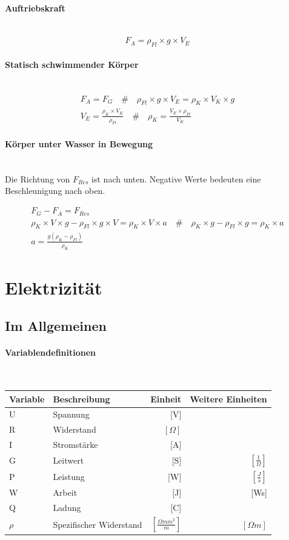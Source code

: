 \documentclass[a4paper,10pt]{article}
\newcommand{\lbparagraph}[1]{\paragraph{#1}\mbox{}\\}
\newcommand{\eqsp}[1]{\quad\#\quad}
\begin{document}
\lbparagraph{Auftriebskraft}

\begin{equation}
    F_A = {\rho}_{Fl} \times g \times V_E
\end{equation}

\lbparagraph{Statisch schwimmender Körper}

\begin{gather}
    F_A = F_G
    \eqsp{}
    {\rho}_{Fl} \times g \times V_E = {\rho}_K \times V_K \times g
    \\
    V_E = \frac{{\rho}_K \times V_K}{{\rho}_{Fl}}
    \eqsp{}
    {\rho}_K = \frac{V_E \times {\rho}_{Fl}}{V_K}
\end{gather}

\lbparagraph{Körper unter Wasser in Bewegung}

Die Richtung von $F_{Res}$ ist nach unten. Negative Werte bedeuten eine Beschleunigung nach oben.

\begin{gather}
    F_G - F_A = F_{Res}
    \\
    {\rho}_K \times V \times g - {\rho}_{Fl} \times g \times V = {\rho}_K \times V \times a
    \eqsp{}
    {\rho}_K \times g - {\rho}_{Fl} \times g = {\rho}_K\times a
    \\
    a = \frac{g({\rho}_K - {\rho}_{Fl})}{{\rho}_K}
\end{gather}

\section{Elektrizität}

\subsection{Im Allgemeinen}

\lbparagraph{Variablendefinitionen}

\begin{tabular}{l|l|r|r}
    Variable & Beschreibung & Einheit & Weitere Einheiten \\
    \hline
    U & Spannung & [V] & \\
    R & Widerstand & $[\Omega]$ & \\
    I & Stromstärke & [A] & \\
    G & Leitwert & [S] & $[\frac{1}{\Omega}]$ \\
    P & Leistung & [W] & $[\frac{J}{s}]$ \\
    W & Arbeit & [J] & [Ws] \\
    Q & Ladung & [C] & \\
    $\rho$ & Spezifischer Widerstand & $[\frac{{\Omega}mm^2}{m}]$ & $[{\Omega}m]$
\end{tabular}
\end{document}
